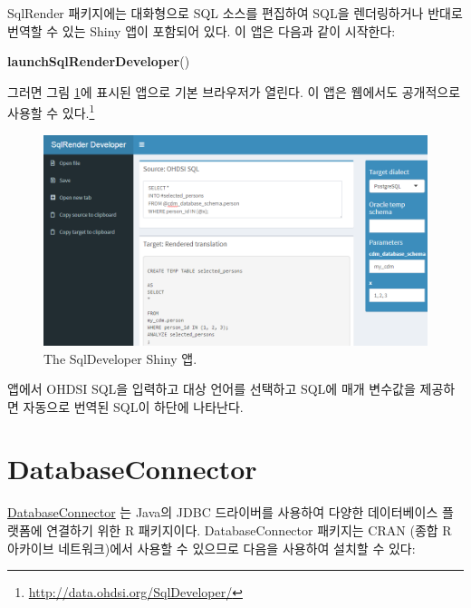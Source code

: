 \documentclass[10.5pt]{book}
\newenvironment{Shaded}{\begin{snugshade}}{\end{snugshade}}
\newcommand{\KeywordTok}[1]{\textcolor[rgb]{0.13,0.29,0.53}{\textbf{#1}}}
\newcommand{\NormalTok}[1]{#1}
\let\rmarkdownfootnote\footnote%
\def\footnote{\protect\rmarkdownfootnote}
\theoremstyle{definition}
\theoremstyle{definition}
\theoremstyle{definition}
\theoremstyle{remark}
\begin{document}
SqlRender 패키지에는 대화형으로 SQL 소스를 편집하여 SQL을 렌더링하거나
반대로 번역할 수 있는 Shiny 앱이 포함되어 있다. 이 앱은 다음과 같이
시작한다:

\begin{Shaded}
\begin{Highlighting}[]
\KeywordTok{launchSqlRenderDeveloper}\NormalTok{()}
\end{Highlighting}
\end{Shaded}

그러면 그림 \ref{fig:sqlDeveloper}에 표시된 앱으로 기본 브라우저가
열린다. 이 앱은 웹에서도 공개적으로 사용할 수 있다.\footnote{\url{http://data.ohdsi.org/SqlDeveloper/}}

\begin{figure}

{\centering \includegraphics[width=1\linewidth]{images/SqlAndR/sqlDeveloper} 

}

\caption{The SqlDeveloper Shiny 앱.}\label{fig:sqlDeveloper}
\end{figure}

앱에서 OHDSI SQL을 입력하고 대상 언어를 선택하고 SQL에 매개 변수값을
제공하면 자동으로 번역된 SQL이 하단에 나타난다.

\hypertarget{DatabaseConnector}{\section{DatabaseConnector}\label{DatabaseConnector}}

\href{https://ohdsi.github.io/DatabaseConnector/}{DatabaseConnector} 는
Java의 JDBC 드라이버를 사용하여 다양한 데이터베이스 플랫폼에 연결하기
위한 R 패키지이다. DatabaseConnector 패키지는 CRAN (종합 R 아카이브
네트워크)에서 사용할 수 있으므로 다음을 사용하여 설치할 수 있다:
\end{document}
